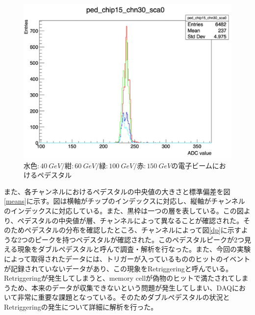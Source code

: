 \begin{figure}[H]
\begin{center}
 \includegraphics[keepaspectratio, scale=0.3]
 	{Figure/Beamtest/pedestal.png}
 		\caption[異なるビームエネルギーにおけるペデスタル]{$水色: \SI{40}{GeV}/紺: \SI{60}{GeV}/緑: \SI{100}{GeV}/赤: \SI{150}{GeV}$の電子ビームにおけるペデスタル}
		\label{pedestal}
\end{center}
\end{figure}
また、各チャンネルにおけるペデスタルの中央値の大きさと標準偏差を図\ref{means}に示す。図は横軸がチップのインデックスに対応し、縦軸がチャンネルのインデックスに対応している。また、黒枠は一つの層を表している。この図より、ペデスタルの中央値が層、チャンネルによって異なることが確認された。そのためぺデスタルの分布を確認したところ、チャンネルによって図\ref{dp}に示すような2つのピークを持つペデスタルが確認された。このペデスタルピークが2つ見える現象をダブルぺデスタルと呼んで調査・解析を行なった。また、今回の実験によって取得されたデータには、トリガーが入っているもののヒットのイベントが記録されていないデータがあり、この現象をRetriggeringと呼んでいる。Retriggeringが発生してしまうと、memory cellが偽物のヒットで満たされてしまうため、本来のデータが収集できないという問題が発生してしまい、DAQにおいて非常に重要な課題となっている。そのためダブルぺデスタルの状況とRetriggeringの発生について詳細に解析を行った。\\

